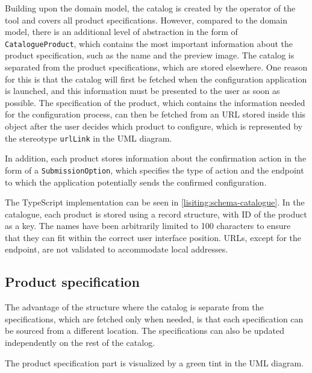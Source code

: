 Building upon the domain model, the catalog is created by the operator of the tool and covers all product specifications. However, compared to the domain model, there is an additional level of abstraction in the form of \texttt{CatalogueProduct}, which contains the most important information about the product specification, such as the name and the preview image. The catalog is separated from the product specifications, which are stored elsewhere. One reason for this is that the catalog will first be fetched when the configuration application is launched, and this information must be presented to the user as soon as possible. The specification of the product, which contains the information needed for the configuration process, can then be fetched from an URL stored inside this object after the user decides which product to configure, which is represented by the stereotype \texttt{urlLink} in the UML diagram.

In addition, each product stores information about the confirmation action in the form of a \texttt{SubmissionOption}, which specifies the type of action and the endpoint to which the application potentially sends the confirmed configuration.

The TypeScript implementation can be seen in \autoref{lisiting:schema-catalogue}. In the catalogue, each product is stored using a record structure, with ID of the product as a key. The names have been arbitrarily limited to 100 characters to ensure that they can fit within the correct user interface position. URLs, except for the endpoint, are not validated to accommodate local addresses.


\subsection{Product specification}

The advantage of the structure where the catalog is separate from the specifications, which are fetched only when needed, is that each specification can be sourced from a different location. The specifications can also be updated independently on the rest of the catalog.

The product specification part is visualized by a green tint in the UML diagram.  

